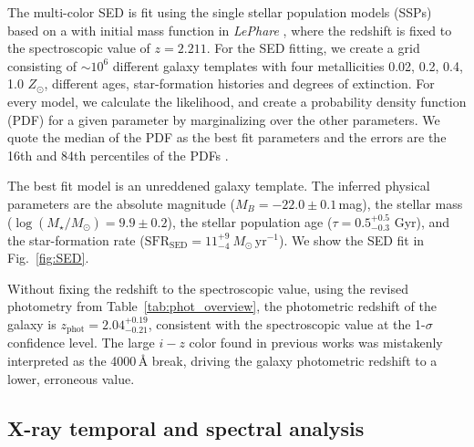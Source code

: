 \documentclass{aa}    %
\begin{document}


The multi-color SED is fit using the \citet{Bruzual2003} single stellar
population models (SSPs) based on a \citet{Chabrier2003} with initial mass
function in \emph{LePhare} \citep{Ilbert2006}, where the redshift is fixed to
the spectroscopic value of $z=2.211$. For the SED fitting, we create a grid
consisting of $\sim 10^6$  different galaxy templates with four metallicities
0.02, 0.2, 0.4, 1.0 $Z_{\odot}$, different ages, star-formation histories and
degrees of extinction. For every model, we calculate the likelihood, and create
a probability density function (PDF) for a given parameter by marginalizing over
the other parameters. We quote the median of the PDF as the best fit parameters
and the errors are the 16th and 84th percentiles of the PDFs \citep[e.g.
see][for details on the SED fitting procedure]{Schulze2016}.

The best fit model is an unreddened galaxy template. The inferred physical
parameters are the absolute magnitude ($M_B=-22.0\pm0.1$\,mag), the stellar mass
($\log(M_{\star}/M_\odot) = 9.9\pm0.2$), the stellar population age ($\tau =
0.5_{-0.3}^{+0.5}$ Gyr), and the star-formation rate
($\mathrm{SFR}_{\mathrm{SED}} = 11_{-4}^{+9}~M_\odot\,\mathrm{yr}^{-1}$). We
show the SED fit in Fig.~\ref{fig:SED}.

Without fixing the redshift to the spectroscopic value, using the revised
photometry from Table~\ref{tab:phot_overview}, the photometric redshift of the
galaxy is $z_{\mathrm{phot}}=2.04_{-0.21}^{+0.19}$, consistent with the
spectroscopic value at the 1-$\sigma$ confidence level. The large $i-z$ color
found in previous works was mistakenly interpreted as the 4000\,\AA{} break,
driving the galaxy photometric redshift to a lower, erroneous value.

\subsection{X-ray temporal and spectral analysis}\label{xray}
\end{document}
